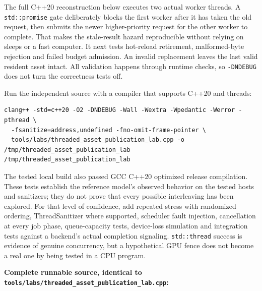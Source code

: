 The full C++20 reconstruction below executes two actual worker threads. A \texttt{std::promise} gate deliberately blocks the first worker after it has taken the old request, then submits the newer higher-priority request for the other worker to complete. That makes the stale-result hazard reproducible without relying on sleeps or a fast computer. It next tests hot-reload retirement, malformed-byte rejection and failed budget admission. An invalid replacement leaves the last valid resident asset intact. All validation happens through runtime checks, so \texttt{-DNDEBUG} does not turn the correctness tests off.

Run the independent source with a compiler that supports C++20 and threads:

\begin{verbatim}
clang++ -std=c++20 -O2 -DNDEBUG -Wall -Wextra -Wpedantic -Werror -pthread \
  -fsanitize=address,undefined -fno-omit-frame-pointer \
  tools/labs/threaded_asset_publication_lab.cpp -o /tmp/threaded_asset_publication_lab
/tmp/threaded_asset_publication_lab
\end{verbatim}

The tested local build also passed GCC C++20 optimized release compilation. These tests establish the reference model's observed behavior on the tested hosts and sanitizers; they do not prove that every possible interleaving has been explored. For that level of confidence, add repeated stress with randomized ordering, ThreadSanitizer where supported, scheduler fault injection, cancellation at every job phase, queue-capacity tests, device-loss simulation and integration tests against a backend's actual completion signaling. \texttt{std::thread} success is evidence of genuine concurrency, but a hypothetical GPU fence does not become a real one by being tested in a CPU program.

\textbf{Complete runnable source, identical to \texttt{tools/labs/threaded\_asset\_publication\_lab.cpp}:}

